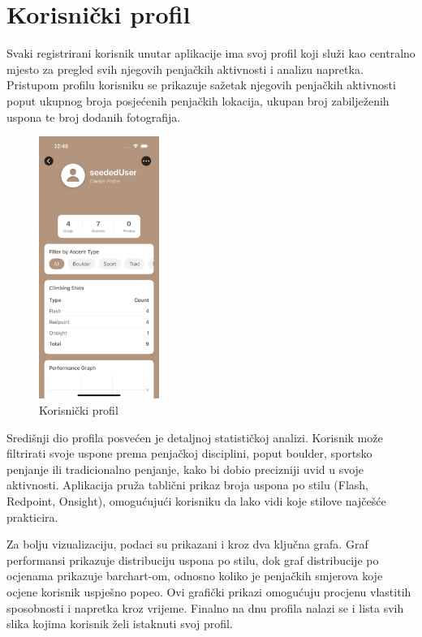 \section{Korisnički profil}

Svaki registrirani korisnik unutar aplikacije ima svoj profil koji služi kao centralno mjesto za pregled svih njegovih penjačkih aktivnosti i analizu napretka. Pristupom profilu korisniku se prikazuje sažetak njegovih penjačkih aktivnosti poput ukupnog broja posjećenih penjačkih lokacija, ukupan broj zabilježenih uspona te broj dodanih fotografija.

\begin{figure}[H]
    \centering
    \includegraphics[width=0.35\textwidth]{images/implementacija/user_profile_1.png}
    \caption{Korisnički profil}
    \label{fig:korisnički_profil}
\end{figure}

Središnji dio profila posvećen je detaljnoj statističkoj analizi. Korisnik može filtrirati svoje uspone prema penjačkoj disciplini, poput boulder, sportsko penjanje ili tradicionalno penjanje, kako bi dobio precizniji uvid u svoje aktivnosti. Aplikacija pruža tablični prikaz broja uspona po stilu (Flash, Redpoint, Onsight), omogućujući korisniku da lako vidi koje stilove najčešće prakticira.

Za bolju vizualizaciju, podaci su prikazani i kroz dva ključna grafa. Graf performansi prikazuje distribuciju uspona po stilu, dok graf distribucije po ocjenama prikazuje barchart-om, odnosno koliko je penjačkih smjerova koje ocjene korisnik uspješno popeo. Ovi grafički prikazi omogućuju procjenu vlastitih sposobnosti i napretka kroz vrijeme. Finalno na dnu profila nalazi se i lista svih slika kojima korisnik želi istaknuti svoj profil.

